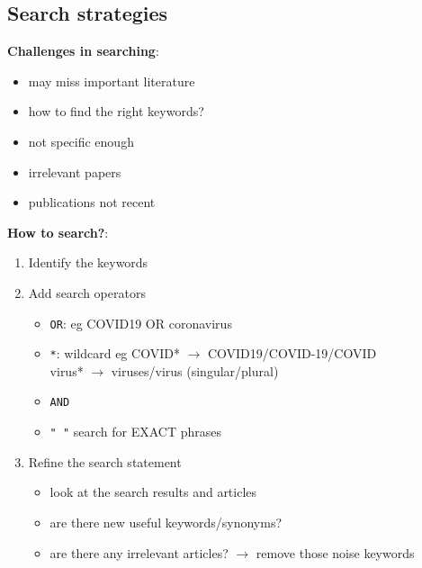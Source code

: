 \documentclass{article}
\begin{document}
\begin{multicols}{2}
\subsection{Search strategies}
\textbf{Challenges in searching}:
\begin{itemize}
	\item may miss important literature
	\item how to find the right keywords?
	\item not specific enough
	\item irrelevant papers
	\item publications not recent
\end{itemize}
\textbf{How to search?}:
\begin{enumerate}
	\item Identify the keywords
	\item Add search operators
	\begin{itemize}
		\item \texttt{OR}: eg COVID19 OR coronavirus
		\item \texttt{*}: wildcard eg COVID* $\rightarrow$ COVID19/COVID-19/COVID\\
		virus* $\rightarrow$ viruses/virus (singular/plural)
		\item \texttt{AND}
		\item \texttt{" "} search for EXACT phrases
	\end{itemize}
	\item Refine the search statement
	\begin{itemize}
		\item look at the search results and articles
		\item are there new useful keywords/synonyms?
		\item are there any irrelevant articles? $\rightarrow$ remove those noise keywords
	\end{itemize}
\end{enumerate}

\end{multicols}
\end{document}
